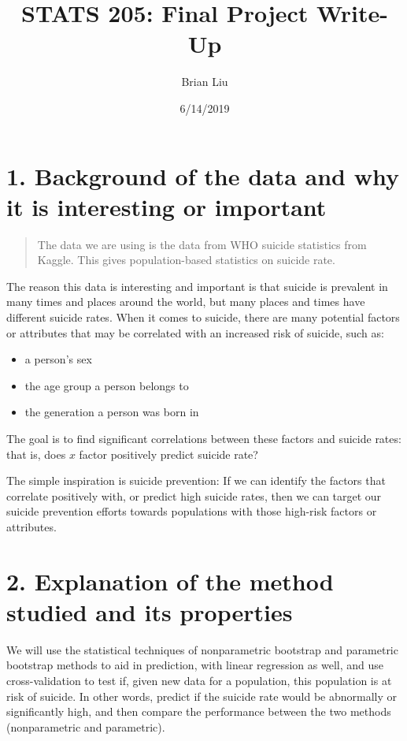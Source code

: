 \documentclass[]{article}
\title{STATS 205: Final Project Write-Up}
\author{Brian Liu}
\date{6/14/2019}
\providecommand{\tightlist}{%
  \setlength{\itemsep}{0pt}\setlength{\parskip}{0pt}}
\begin{document}
\maketitle

\hypertarget{background-of-the-data-and-why-it-is-interesting-or-important}{%
\section{1. Background of the data and why it is interesting or
important}\label{background-of-the-data-and-why-it-is-interesting-or-important}}

\begin{quote}
The data we are using is the data from WHO suicide statistics from
Kaggle. This gives population-based statistics on suicide rate.
\end{quote}

The reason this data is interesting and important is that suicide is
prevalent in many times and places around the world, but many places and
times have different suicide rates. When it comes to suicide, there are
many potential factors or attributes that may be correlated with an
increased risk of suicide, such as:

\begin{itemize}
\tightlist
\item
  a person's sex
\item
  the age group a person belongs to
\item
  the generation a person was born in
\end{itemize}

The goal is to find significant correlations between these factors and
suicide rates: that is, does \(x\) factor positively predict suicide
rate?

The simple inspiration is suicide prevention: If we can identify the
factors that correlate positively with, or predict high suicide rates,
then we can target our suicide prevention efforts towards populations
with those high-risk factors or attributes.

\hypertarget{explanation-of-the-method-studied-and-its-properties}{%
\section{2. Explanation of the method studied and its
properties}\label{explanation-of-the-method-studied-and-its-properties}}

We will use the statistical techniques of nonparametric bootstrap and
parametric bootstrap methods to aid in prediction, with linear
regression as well, and use cross-validation to test if, given new data
for a population, this population is at risk of suicide. In other words,
predict if the suicide rate would be abnormally or significantly high,
and then compare the performance between the two methods (nonparametric
and parametric).
\end{document}
